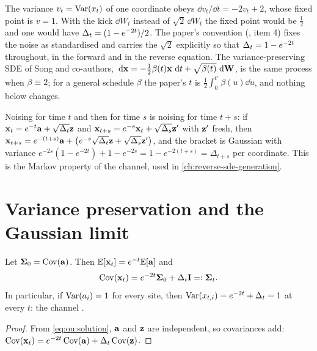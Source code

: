 \begin{remark}
\label{rem:ou:sqrt2}
The variance $v_t=\operatorname{Var}(x_t)$ of one coordinate obeys $\dd v_t/\dd t=-2v_t+2$, whose
fixed point is $v=1$. With the kick $\dd W_t$ instead of $\sqrt2\,\dd W_t$ the fixed
point would be $\tfrac12$ and one would have $\Delta_t=(1-e^{-2t})/2$. The paper's
convention (, item 4) fixes the noise as standardised and
carries the $\sqrt2$ explicitly so that $\Delta_t=1-e^{-2t}$ throughout, in the forward and
in the reverse equation. The variance-preserving SDE of Song and co-authors,
$\,\mathrm{d}\mathbf{x}=-\tfrac12\beta(t)\mathbf{x}\,\,\mathrm{d} t+\sqrt{\beta(t)}\,\,\mathrm{d}\mathbf{W}$, is the same process
when $\beta\equiv2$; for a general schedule $\beta$ the paper's $t$ is
$\tfrac12\int_0^{t'}\beta(u)\dd u$, and nothing below changes.
\end{remark}

\begin{remark}
\label{rem:ou:semigroup}
Noising for time $t$ and then for time $s$ is noising for time $t+s$:
if $\mathbf{x}_t=e^{-t}\mathbf{a}+\sqrt{\Delta_t}\mathbf{z}$ and $\mathbf{x}_{t+s}=e^{-s}\mathbf{x}_t+\sqrt{\Delta_s}\mathbf{z}'$ with
$\mathbf{z}'$ fresh, then $\mathbf{x}_{t+s}=e^{-(t+s)}\mathbf{a}+\bigl(e^{-s}\sqrt{\Delta_t}\mathbf{z}+\sqrt{\Delta_s}\mathbf{z}'\bigr)$,
and the bracket is Gaussian with variance
$e^{-2s}(1-e^{-2t})+1-e^{-2s}=1-e^{-2(t+s)}=\Delta_{t+s}$ per coordinate. This is the
Markov property of the channel, used in \cref{ch:reverse-sde-generation}.
\end{remark}

\section{Variance preservation and the Gaussian limit}
\label{sec:ou:variance}

\begin{proposition}
\label{prop:ou:variance}
Let $\mathbf{\Sigma}_0=\operatorname{Cov}(\mathbf{a})$. Then $\mathbb{E}[\mathbf{x}_t]=e^{-t}\mathbb{E}[\mathbf{a}]$ and
\begin{equation}
  \operatorname{Cov}(\mathbf{x}_t)=e^{-2t}\mathbf{\Sigma}_0+\Delta_t\mathbf{I}=:\mathbf{\Sigma}_t .
  \label{eq:ou:sigmat}
\end{equation}
In particular, if $\operatorname{Var}(a_i)=1$ for every site, then $\operatorname{Var}(x_{t,i})=e^{-2t}+\Delta_t=1$ at
every $t$: the channel .
\end{proposition}

\begin{proof}
From \cref{eq:ou:solution}, $\mathbf{a}$ and $\mathbf{z}$ are independent, so covariances add:
$\operatorname{Cov}(\mathbf{x}_t)=e^{-2t}\operatorname{Cov}(\mathbf{a})+\Delta_t\operatorname{Cov}(\mathbf{z})$.
\end{proof}

